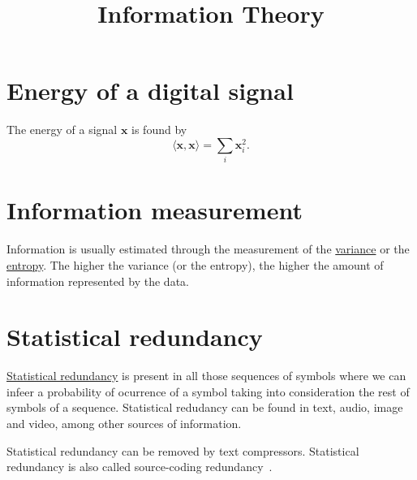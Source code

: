 
\title{Information Theory}
\maketitle
\tableofcontents

\section{Energy of a digital signal}
The energy of a signal ${\mathbf x}$ is found by
\begin{equation}
  \langle {\mathbf x}, {\mathbf x}\rangle =  \sum_{i}{{\mathbf x}_i^2}.
\end{equation}

\section{Information measurement}
Information is usually estimated through the measurement of the
\href{https://en.wikipedia.org/wiki/Variance}{variance} or the
\href{https://en.wikipedia.org/wiki/Entropy}{entropy}. The higher the
variance (or the entropy), the higher the amount of information
represented by the data.

\section{Statistical redundancy}
\href{https://en.wikipedia.org/wiki/Redundancy_(information_theory)}{Statistical
  redundancy} is present in all those sequences of symbols where we
can infeer a probability of ocurrence of a symbol taking into
consideration the rest of symbols of a sequence. Statistical redudancy
can be found in text, audio, image and video, among other sources of
information.

Statistical redundancy can be removed by text compressors. Statistical
redundancy is also called source-coding
redundancy~\cite{kondoz2009visual}.

